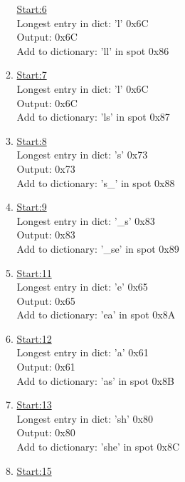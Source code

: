 \documentclass[11pt]{article}
\begin{document}
\begin{enumerate}
\begin{multicols}{2}
\begin{enumerate}
                \underline{Start:6}  \\
                Longest entry in dict: 'l' 0x6C \\
                Output: 0x6C    \\
                Add to dictionary: 'll' in spot 0x86
             \item
                \underline{Start:7}  \\
                Longest entry in dict: 'l' 0x6C \\
                Output: 0x6C    \\
                Add to dictionary: 'ls' in spot 0x87    
             \item
                \underline{Start:8}  \\
                Longest entry in dict: 's' 0x73 \\
                Output: 0x73    \\
                Add to dictionary: 's\_' in spot 0x88    
             \item
                \underline{Start:9}  \\
                Longest entry in dict: '\_s' 0x83 \\
                Output: 0x83    \\
                Add to dictionary: '\_se' in spot 0x89    
             \item
                \underline{Start:11}  \\
                Longest entry in dict: 'e' 0x65 \\
                Output: 0x65    \\
                Add to dictionary: 'ea' in spot 0x8A    
             \item
                \underline{Start:12}  \\
                Longest entry in dict: 'a' 0x61 \\
                Output: 0x61    \\
                Add to dictionary: 'as' in spot 0x8B    
             \item
                \underline{Start:13}  \\
                Longest entry in dict: 'sh' 0x80 \\
                Output: 0x80    \\
                Add to dictionary: 'she' in spot 0x8C    
            \item
                \underline{Start:15}  \\

\end{enumerate}
\end{multicols}
\end{enumerate}
\end{document}
